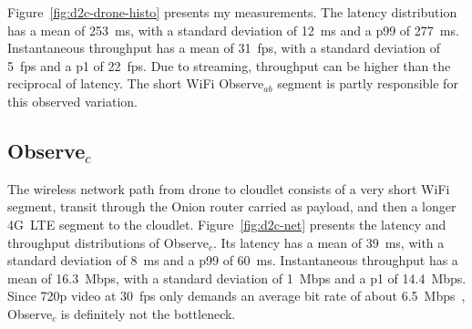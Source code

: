 Figure~\ref{fig:d2c-drone-histo} presents my measurements.  The
latency distribution has a mean of 253~ms, with a standard deviation
of 12~ms and a p99 of 277~ms.  Instantaneous throughput has a mean of
31~fps, with a standard deviation of 5~fps and a p1 of 22~fps.  Due to
streaming, throughput can be higher than the reciprocal of latency.
The short WiFi Observe$_{ab}$ segment is partly responsible for this observed variation.

\subsection{Observe$_c$}
\label{sec:netdownlink}

The wireless network path
from drone to cloudlet consists of a very short WiFi segment, transit
through the Onion router carried as payload, and then a longer 4G~LTE
segment to the cloudlet.  Figure~\ref{fig:d2c-net} presents the
latency and throughput distributions of Observe$_c$.  Its latency has
a mean of 39~ms, with a standard deviation of 8~ms and a p99 of 60~ms.
Instantaneous throughput has a mean of 16.3~Mbps, with a standard
deviation of 1~Mbps and a p1 of 14.4~Mbps.  Since 720p video at 30~fps
only demands an average bit rate of about 6.5~Mbps~\cite{Adobe2024},
Observe$_c$ is definitely not the bottleneck.

